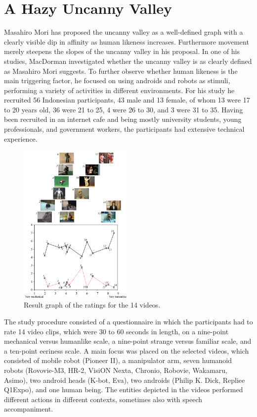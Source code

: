 \section{A Hazy Uncanny Valley}
Masahiro Mori has proposed the uncanny valley as a well-defined graph with a clearly visible dip in affinity as human likeness increases. Furthermore movement merely steepens the slopes of the uncanny valley in his proposal.
In one of his studies, MacDorman \cite{uncanny_ambiguous} investigated whether the uncanny valley is as clearly defined as Masahiro Mori suggests. To further observe whether human likeness is the main triggering factor, he focused on using androids and robots as stimuli, performing a variety of activities in different environments. For his study he recruited 56 Indonesian participants, 43 male and 13 female, of whom 13 were 17 to 20 years old, 36 were 21 to 25, 4 were 26 to 30, and 3 were 31 to 35. Having been recruited in an internet cafe and being mostly  university students, young professionals, and government workers, the participants had extensive technical experience.\newpage
\begin{figure} %
    \centering
    \includegraphics[width=0.5\textwidth]{graphics/hazy_uncanny.png}
    \caption{Result graph of the ratings for the 14 videos.}
    \label{fig:hazyUncanny}
\end{figure}
The study procedure consisted of a questionnaire in which the participants had to rate 14 video clips, which were 30 to 60 seconds in length, on a nine-point mechanical versus humanlike scale, a nine-point strange versus familiar scale, and a
ten-point eeriness scale. A main focus was placed on the selected videos, which consisted of  mobile robot (Pioneer II), a manipulator arm, seven humanoid robots (Rovovie-M3, HR-2, VisiON Nexta, Chronio, Robovie, Wakamaru, Asimo), two android heads (K-bot, Eva), two androids (Philip K. Dick, Repliee Q1Expo), and one human being. The entities depicted in the videos performed different actions in different contexts, sometimes also with speech accompaniment.\\
